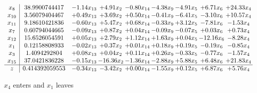 \documentclass[9pt]{article}
\begin{document}
 \[\begin{array}{c| c c@{\hskip 2pt} c@{\hskip 2pt} c@{\hskip 2pt} c@{\hskip 2pt} c@{\hskip 2pt} c@{\hskip 2pt} c@{\hskip 2pt} }
 x_{8}   &  38.9900744417 & -1.14 x_{13} & +  4.91 x_{2} & -0.80 x_{14} & -4.38 x_{9} & -4.91 x_{5} & +  6.71 x_{6} & + 24.33 x_{4}\\
 x_{10}   &  3.56079404467 & +  0.49 x_{13} & +  3.69 x_{2} & +  0.50 x_{14} & -0.41 x_{9} & -6.41 x_{5} & -3.10 x_{6} & + 10.57 x_{4}\\
 x_{11}   &  9.18610421836 & -0.60 x_{13} & +  5.47 x_{2} & +  0.68 x_{14} & -0.33 x_{9} & +  3.12 x_{5} & -7.81 x_{6} & -1.53 x_{4}\\
 x_{7}   &  0.60794044665 & -0.09 x_{13} & +  0.87 x_{2} & +  0.04 x_{14} & -0.09 x_{9} & -0.07 x_{5} & +  0.03 x_{6} & +  0.73 x_{4}\\
 x_{12}   &  15.6526054591 & +  0.05 x_{13} & +  2.79 x_{2} & +  1.12 x_{14} & +  1.63 x_{9} & +  0.04 x_{5} & -12.16 x_{6} & -8.28 x_{4}\\
 x_{1}   &  0.12158808933 & -0.02 x_{13} & +  0.37 x_{2} & +  0.01 x_{14} & +  0.18 x_{9} & +  0.19 x_{5} & -0.19 x_{6} & -0.85 x_{4}\\
 x_{3}   &  1.4094292804 & +  0.08 x_{13} & +  0.04 x_{2} & +  0.11 x_{14} & +  0.26 x_{9} & -0.33 x_{5} & -0.77 x_{6} & -1.57 x_{4}\\
 x_{15}   &  37.0421836228 & -0.15 x_{13} & -16.36 x_{2} & -1.36 x_{14} & -2.88 x_{9} & +  5.88 x_{5} & +  6.48 x_{6} & + 21.83 x_{4}\\
\hline
z    &  0.414392059553 & -0.34 x_{13} & -3.42 x_{2} & +  0.00 x_{14} & -1.55 x_{9} & +  0.12 x_{5} & +  6.87 x_{6} & +  5.76 x_{4}\\
\end{array}\]


 $ x_{4} $ enters and $ x_{1} $ leaves 
\end{document}
